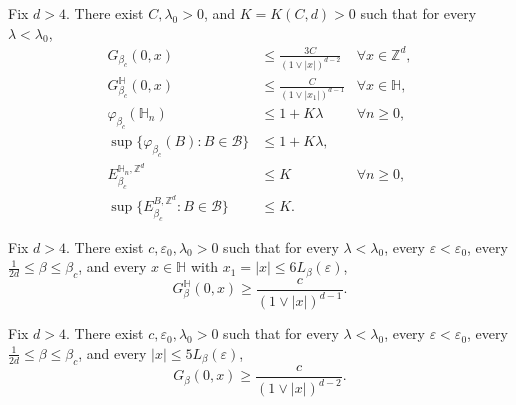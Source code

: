 \documentclass[10pt,a4paper]{amsart}
\begin{document}
\begin{Prop}\label{prop: theorem beta start = beta_c}
Fix $d>4$. There exist $C,\lambda_0>0$, and $K=K(C,d)>0$ such that for every $\lambda<\lambda_0$,
\begin{align}
G_{\beta_c}(0,x)&\le \frac{3C}{(1\vee|x|)^{d-2}}&\forall x\in \mathbb Z^d,\label{eq:upper bound below L}\\
G_{\beta_c}^{\mathbb H}(0,x)&\le \frac{C}{(1\vee|x_1|)^{d-1}}&\forall x\in \mathbb H
\label{eq:upper half-spacebound below L},\\
\label{eq: bound phi_n final prop}
\varphi_{\beta_c}(\mathbb H_n)&\le 1+K\lambda &\forall n\ge0,\\
\sup\{\varphi_{\beta_c}(B):B\in \mathcal B\}&\le 1+K\lambda, &\\
E^{\mathbb H_n,\mathbb Z^d}_{\beta_c}&\leq K &\forall n\geq 0,
\\
\sup\big\{E^{B,\mathbb Z^d}_{\beta_c}:B\in \mathcal B\big\}&\leq K. &\label{eq:general bound error last prop}
\end{align} 
\end{Prop}

\begin{Lem}\label{lem:lower below half-space}
Fix $d>4$. There exist $c,\varepsilon_0,\lambda_0>0$ such that for every $\lambda<\lambda_0$, every $\varepsilon<\varepsilon_0$, every $\tfrac1{2d}\le \beta\le \beta_c$, and every $x\in \mathbb H$ with $x_1=|x|\le 6L_\beta(\varepsilon)$,
\begin{equation}\label{eq:op}
G_\beta^{\mathbb H}(0,x)\ge \frac{c}{(1\vee|x|)^{d-1}}.
\end{equation}
\end{Lem}

\begin{Lem}\label{lem:lower below full-space}
Fix $d>4$. There exist $c,\varepsilon_0,\lambda_0>0$ such that for every $\lambda<\lambda_0$, every $\varepsilon<\varepsilon_0$, every $\tfrac1{2d}\le \beta\le \beta_c$, and every $|x|\le5L_\beta(\varepsilon)$,
\begin{equation}\label{eq:lb full below 5L}
G_\beta(0,x)\ge \frac{c}{(1\vee|x|)^{d-2}}.
\end{equation}
\end{Lem}
\end{document}

